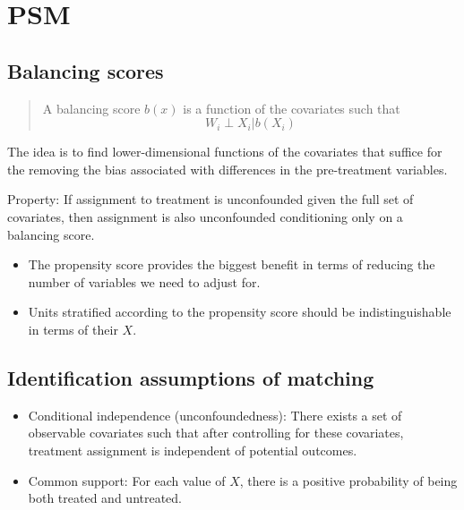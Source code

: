 \documentclass[
]{ctexart}
\providecommand{\tightlist}{%
  \setlength{\itemsep}{0pt}\setlength{\parskip}{0pt}}
\newcommand{\0}{\textbf 0}
\newcommand{\1}{\textbf 1}
\def\pr#1{\left(#1\right)}
\begin{document}
\hypertarget{psm}{%
\section{PSM}\label{psm}}

\hypertarget{balancing-scores}{%
\subsection{Balancing scores}\label{balancing-scores}}

\begin{quote}
A balancing score \(b\pr x\) is a function of the covariates such that
\[
W_i\perp X_i|b\pr{X_i}
\]
\end{quote}

The idea is to find lower-dimensional functions of the covariates that
suffice for the removing the bias associated with differences in the
pre-treatment variables.

Property: If assignment to treatment is unconfounded given the full set
of covariates, then assignment is also unconfounded conditioning only on
a balancing score.

\begin{itemize}
\tightlist
\item
  The propensity score provides the biggest benefit in terms of reducing
  the number of variables we need to adjust for.
\item
  Units stratified according to the propensity score should be
  indistinguishable in terms of their \(X\).
\end{itemize}

\hypertarget{identification-assumptions-of-matching}{%
\subsection{Identification assumptions of
matching}\label{identification-assumptions-of-matching}}

\begin{itemize}
\tightlist
\item
  Conditional independence (unconfoundedness): There exists a set of
  observable covariates such that after controlling for these
  covariates, treatment assignment is independent of potential outcomes.
\item
  Common support: For each value of \(X\), there is a positive
  probability of being both treated and untreated.
\end{itemize}
\end{document}
